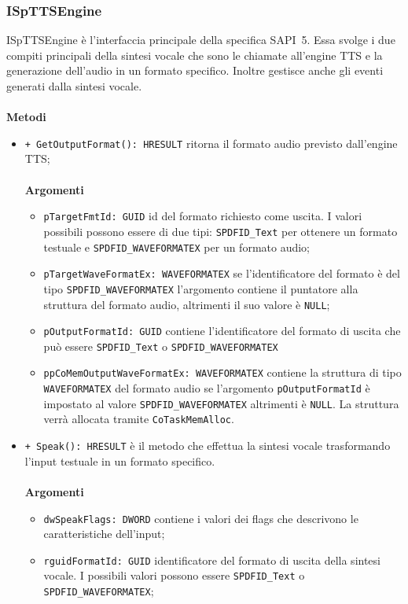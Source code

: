      \subsubsection{ISpTTSEngine}
     ISpTTSEngine è l'interfaccia principale della specifica SAPI~5. Essa svolge i due compiti principali della sintesi vocale che sono le chiamate all'engine TTS e la generazione dell'audio in un formato specifico. Inoltre gestisce anche gli eventi generati dalla sintesi vocale.
     \\\\
     \textbf{Metodi}
     \begin{itemize}
     	\item \texttt{+ GetOutputFormat(): HRESULT} ritorna il formato audio previsto dall'engine TTS;
     	\\\\
		\textbf{Argomenti}
		\begin{itemize}
			\item \texttt{pTargetFmtId: GUID} id del formato richiesto come uscita. I valori possibili possono essere di due tipi: \texttt{SPDFID\_Text} per ottenere un formato testuale e \texttt{SPDFID\_WAVEFORMATEX} per un formato audio;
			\item \texttt{pTargetWaveFormatEx: WAVEFORMATEX} se l'identificatore del formato è del tipo \texttt{SPDFID\_WAVEFORMATEX} l'argomento contiene il puntatore alla struttura del formato audio, altrimenti il suo valore è \texttt{NULL};
			\item \texttt{pOutputFormatId: GUID} contiene l'identificatore del formato di uscita che può essere \texttt{SPDFID\_Text} o \texttt{SPDFID\_WAVEFORMATEX}
			\item \texttt{ppCoMemOutputWaveFormatEx: WAVEFORMATEX} contiene la struttura di tipo \texttt{WAVEFORMATEX} del formato audio se l'argomento \texttt{pOutputFormatId} è impostato al valore \texttt{SPDFID\_WAVEFORMATEX} altrimenti è \texttt{NULL}. La struttura verrà allocata tramite \texttt{CoTaskMemAlloc}.
		\end{itemize}
		\item \texttt{+ Speak(): HRESULT} è il metodo che effettua la sintesi vocale trasformando l'input testuale in un formato specifico.
		\\\\
		\textbf{Argomenti}
		\begin{itemize}
			\item \texttt{dwSpeakFlags: DWORD} contiene i valori dei flags che descrivono le caratteristiche dell'input;
			\item \texttt{rguidFormatId: GUID} identificatore del formato di uscita della sintesi vocale. I possibili valori possono essere \texttt{SPDFID\_Text} o \texttt{SPDFID\_WAVEFORMATEX};

\end{itemize}
\end{itemize}
